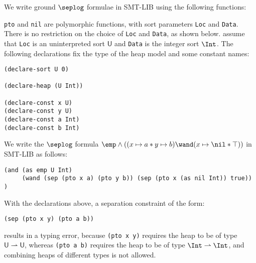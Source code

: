\documentclass[10pt]{llncs}
\begin{document}
We write ground $\seplog$ formulae in SMT-LIB using the following functions: 
\begin{center}
\end{center}
{\tt pto} and {\tt nil} are polymorphic functions, with
sort parameters {\tt Loc} and {\tt Data}. There is no restriction on
the choice of {\tt Loc} and {\tt Data}, as shown below. 
 assume that {\tt Loc} is an uninterpreted sort $\mathsf{U}$ and 
{\tt Data} is the integer sort $\Int$. The following declarations
fix the type of the heap model and some constant names:
\begin{Verbatim}
(declare-sort U 0)

(declare-heap (U Int))

(declare-const x U)
(declare-const y U)
(declare-const a Int)
(declare-const b Int)
\end{Verbatim}
We write the $\seplog$ formula \(\emp \wedge ((x \mapsto a * y \mapsto
b) \wand (x \mapsto \nil * \top))\) in SMT-LIB as follows:
\begin{Verbatim}
(and (as emp U Int) 
     (wand (sep (pto x a) (pto y b)) (sep (pto x (as nil Int)) true))
)
\end{Verbatim}
With the declarations above, a separation constraint of the form: 
\begin{Verbatim}
(sep (pto x y) (pto a b))
\end{Verbatim}
results in a typing error, because {\tt (pto x y)} requires 
the heap to be of type $\mathsf{U} \rightharpoonup \mathsf{U}$, 
whereas {\tt (pto a b)} requires the heap
to be of type $\Int \rightharpoonup \Int$, and combining heaps of
different types is not allowed. 
\end{document}
